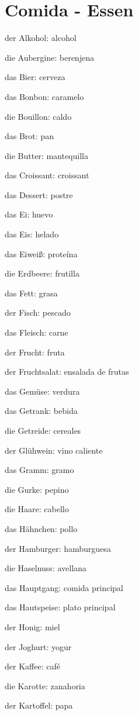 \section{Comida - Essen}
\begin{multicols}{2}
\begin{myitemize}
\item der Alkohol: alcohol
\item die Aubergine: berenjena
\item das Bier: cerveza
\item das Bonbon: caramelo
\item die Bouillon: caldo
\item das Brot: pan
\item die Butter: mantequilla
\item das Croissant: croissant
\item das Dessert: postre
\item das Ei: huevo
\item das Eis: helado
\item das Eiweiß: proteína
\item die Erdbeere: frutilla
\item das Fett: grasa
\item der Fisch: pescado
\item das Fleisch: carne 
\item der Frucht: fruta
\item der Fruchtsalat: ensalada de frutas
\item das Gemüse: verdura
\item das Getrank: bebida
\item die Getreide: cereales
\item der Glühwein: vino caliente
\item das Gramm: gramo
\item die Gurke: pepino
\item die Haare: cabello
\item das Hähnchen: pollo
\item der Hamburger: hamburguesa
\item die Haselnuss: avellana
\item das Hauptgang: comida principal
\item das Hautspeise: plato principal
\item der Honig: miel
\item der Joghurt: yogur
\item der Kaffee: café
\item die Karotte: zanahoria
\item der Kartoffel: papa

\end{myitemize}
\end{multicols}
